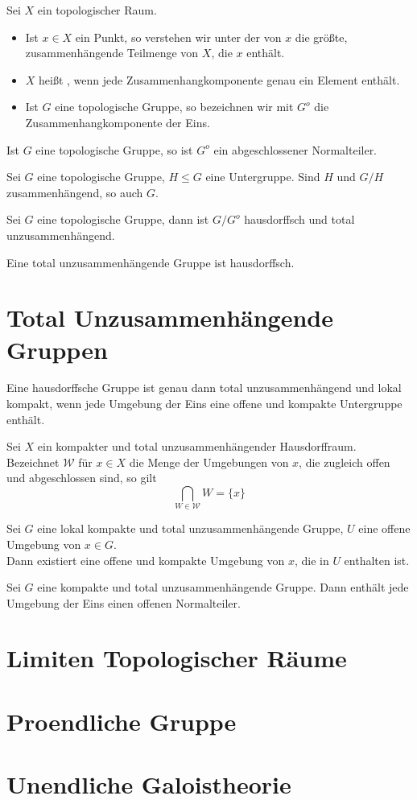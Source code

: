 \documentclass{book}
\begin{document}
\Def{}
Sei $X$ ein topologischer Raum.
\begin{itemize}
\item Ist $x \in X$ ein Punkt, so verstehen wir unter der  von $x$ die größte, zusammenhängende Teilmenge von $X$, die $x$ enthält.
\item $X$ heißt , wenn jede Zusammenhangkomponente genau ein Element enthält.
\item Ist $G$ eine topologische Gruppe, so bezeichnen wir mit $G^o$ die Zusammenhangkomponente der Eins. 
\end{itemize}

\Prop{}
Ist $G$ eine topologische Gruppe, so ist $G^o$ ein abgeschlossener Normalteiler.

\Prop{}
Sei $G$ eine topologische Gruppe, $H \leq G$ eine Untergruppe. Sind $H$ und $G/H$ zusammenhängend, so auch $G$.

\Prop{}
Sei $G$ eine topologische Gruppe, dann ist $G/G^o$ hausdorffsch und total unzusammenhängend.

\Bem{}
Eine total unzusammenhängende Gruppe ist hausdorffsch.

\section{Total Unzusammenhängende Gruppen}
\Satz{}
Eine hausdorffsche Gruppe ist genau dann total unzusammenhängend und lokal kompakt, wenn jede Umgebung der Eins eine offene und kompakte Untergruppe enthält.

\Lem{}
Sei $X$ ein kompakter und total unzusammenhängender Hausdorffraum. Bezeichnet $\mathcal{W}$ für $x \in X$ die Menge der Umgebungen von $x$, die zugleich offen und abgeschlossen sind, so gilt
\[ \bigcap_{W\in \mathcal{W}} W = \{x\} \]

\Lem{}
Sei $G$ eine lokal kompakte und total unzusammenhängende Gruppe, $U$ eine offene Umgebung von $x \in G$.\\
Dann existiert eine offene und kompakte Umgebung von $x$, die in $U$ enthalten ist.

\Kor{}
Sei $G$ eine kompakte und total unzusammenhängende Gruppe. Dann enthält jede Umgebung der Eins einen offenen Normalteiler.

\section{Limiten Topologischer Räume}

\section{Proendliche Gruppe}
\section{Unendliche Galoistheorie}
\end{document}
